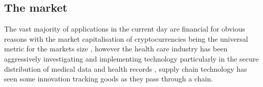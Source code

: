 
\subsection{The market}

The vast majority of  applications in the current day are financial for obvious reasons with the market capitalisation of cryptocurrencies being the universal metric for the  markets size \cite{wood_2021}, however the health care industry has been aggressively investigating and implementing  technology particularly in the secure distribution of medical data and health records \cite{8167115}, supply chain technology has seen some innovation tracking goods as they pass through a chain. 